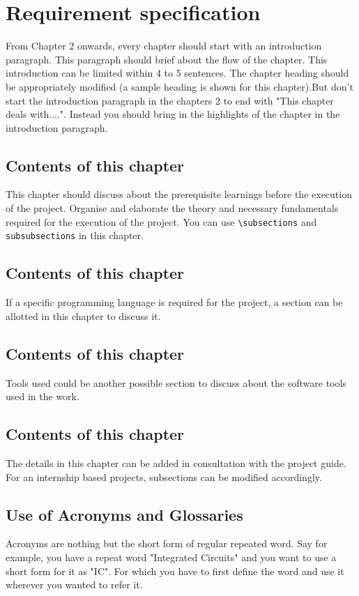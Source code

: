 \chapter{Requirement specification}

From Chapter 2 onwards, every chapter should start with an introduction paragraph. This paragraph should brief about the flow of the chapter. This introduction can be limited within 4 to 5 sentences. The chapter heading should be appropriately modified (a sample heading is shown for this chapter).But don't start the introduction paragraph in the chapters 2 to end with "This chapter deals with....". Instead you should bring in the highlights of the chapter in the introduction paragraph.

\section{Contents of this chapter}

This chapter should discuss about the prerequisite learnings before the execution of the project. Organise and elaborate the theory and necessary fundamentals required for the execution of the project. You can use \verb|\subsections| and \verb|subsubsections| in this chapter.
\section{Contents of this chapter}
If a specific programming language is required for the project, a section can be allotted in this chapter to discuss it. 
\section{Contents of this chapter}
Tools used could be another possible section to discuss about the software tools used in the work. 
\section{Contents of this chapter}
The details in this chapter can be added in consultation with the project guide. For an internship based projects, subsections can be modified accordingly. 

\section{Use of Acronyms and Glossaries}
Acronyms are nothing but the short form of regular repeated word. Say for example, you have a repeat word "Integrated Circuits" and you want to use a short form for it as "IC". For which you have to first define the word and use it wherever you wanted to refer it.

